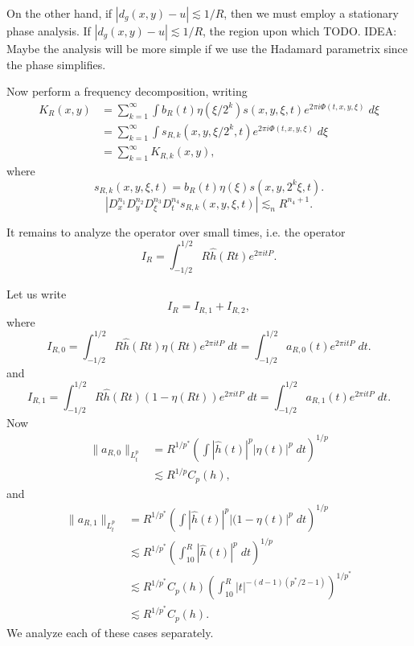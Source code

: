 On the other hand, if $|d_g(x,y) - u| \lesssim 1/R$, then we must employ a stationary phase analysis. If $|d_g(x,y) - u| \lesssim 1/R$, the region upon which TODO. IDEA: Maybe the analysis will be more simple if we use the Hadamard parametrix since the phase simplifies.





Now perform a frequency decomposition, writing
%
\begin{align*}
    K_R(x,y) &= \sum_{k=1}^\infty \int b_R(t) \eta(\xi / 2^k) s(x,y,\xi,t) e^{2 \pi i \Phi(t,x,y,\xi)}\; d\xi\\
    &= \sum_{k = 1}^\infty \int s_{R,k}(x,y,\xi / 2^k,t) e^{2 \pi i \Phi(t,x,y,\xi)}\; d\xi\\
    &= \sum_{k = 1}^\infty K_{R,k}(x,y),
\end{align*}    
%
where
%
\[ s_{R,k}(x,y,\xi,t) = b_R(t) \eta(\xi) s(x,y,2^k \xi, t). \]
%
%
\[ |D^{n_1}_x D^{n_2}_y D^{n_3}_\xi D^{n_4}_t s_{R,k}(x,y,\xi,t)| \lesssim_n R^{n_4+1}. \]


\newpage



It remains to analyze the operator over small times, i.e. the operator
%
\[ I_R = \int_{-1/2}^{1/2} R \widehat{h}(Rt) e^{2 \pi i t P}. \]
%


Let us write
%
\[ I_R = I_{R,1} + I_{R,2}, \]
%
where
%
\[ I_{R,0} = \int_{-1/2}^{1/2} R \widehat{h}(Rt) \eta(Rt) e^{2 \pi i t P}\; dt = \int_{-1/2}^{1/2} a_{R,0}(t) e^{2 \pi i t P}\; dt. \]
%
and
%
\[ I_{R,1} = \int_{-1/2}^{1/2} R \widehat{h}(Rt) (1 - \eta(Rt)) e^{2 \pi i t P}\; dt = \int_{-1/2}^{1/2} a_{R,1}(t) e^{2 \pi i t P}\; dt. \]
%
Now
%
\begin{align*}
    \| a_{R,0} \|_{L^p_t} &= R^{1/p^*} \left( \int |\widehat{h}(t)|^p |\eta(t)|^p\; dt \right)^{1/p}\\
    &\lesssim R^{1/p} C_p(h),
\end{align*}
%
and
%
\begin{align*}
    \| a_{R,1} \|_{L^p_t} &= R^{1/p^*} \left( \int |\widehat{h}(t)|^p |(1 - \eta(t)|^p\; dt \right)^{1/p}\\
    &\lesssim R^{1/p^*} \left( \int_{10}^R |\widehat{h}(t)|^p\; dt \right)^{1/p}\\
    &\lesssim R^{1/p^*} C_p(h) \left( \int_{10}^R |t|^{-(d-1)(p^*/2 - 1)} \right)^{1/p^*}\\
    &\lesssim R^{1/p^*} C_p(h).
\end{align*}
%
We analyze each of these cases separately.

